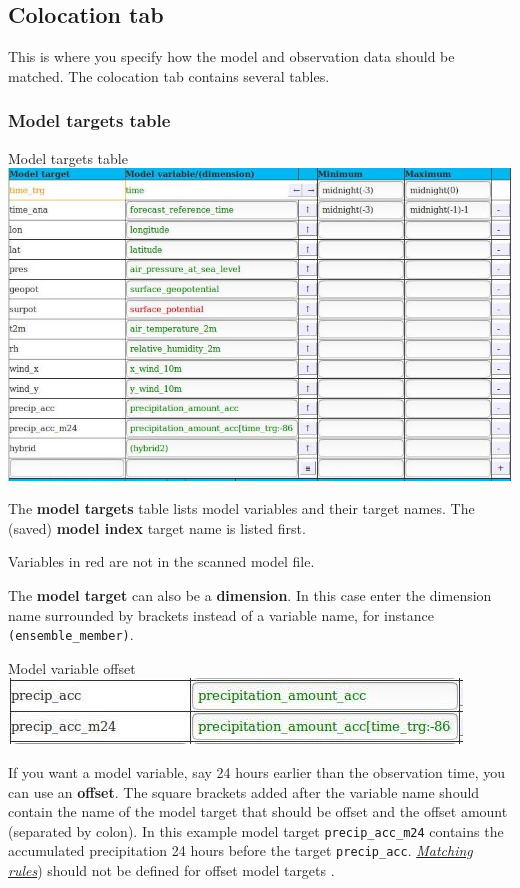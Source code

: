 \documentclass[letterpaper,10pt,twoside,twocolumn,openany]{book}
\begin{document}
\subsection{Colocation tab}
This is where you specify how the model and 
observation data should be matched.
The colocation tab contains several tables.

\subsubsection{Model targets table}
\begin{paperbox}{Model targets table}
  \includegraphics[width=\columnwidth]{coloc_model.jpg}
\end{paperbox}
The {\bf model targets} table lists model variables and their target names.
The (saved) {\bf model index} target name is listed first.
\begin{quotebox}
  Variables in red are not in the scanned model file.
\end{quotebox}
The {\bf model target} can also be a {\bf dimension}. 
In this case enter the dimension name surrounded by brackets instead of a variable name,
for instance \lstinline!(ensemble_member)!.
\begin{paperbox}{Model variable offset}
  \includegraphics[width=\columnwidth]{offset.jpg}
\end{paperbox}
If you want a model variable, say 24 hours earlier than the observation time, you can use an {\bf offset}.
The square brackets added after the variable name should contain the 
name of the model target that should be offset and the offset amount (separated by colon).
In this example model target \lstinline!precip_acc_m24! contains the accumulated precipitation 24 
hours before the target \lstinline!precip_acc!.
\hyperlink{matching}{\em Matching rules}) should not be defined for offset model targets .
\end{document}
